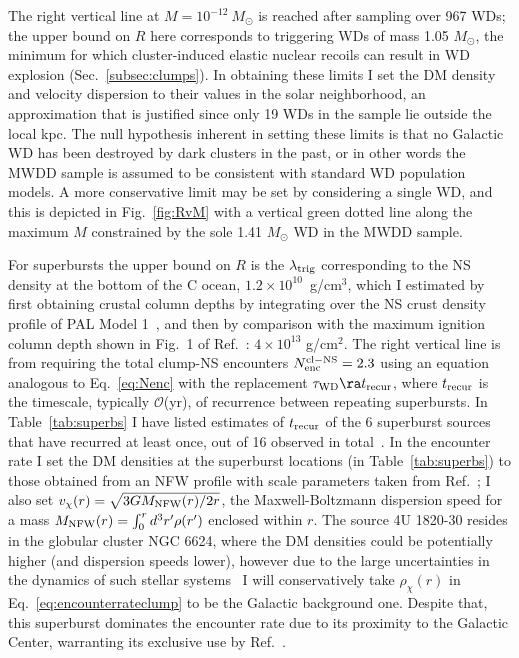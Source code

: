 \documentclass[
    twocolumn,
	prd,
        amssymb,
	preprintnumbers,
	secnumarabic,
	nofootinbib,
	superscriptaddress]{revtex4-1}
\begin{document}
The right vertical line at $M = 10^{-12}~M_\odot$ is reached after sampling over 967 WDs; the upper bound on $R$ here corresponds to triggering WDs of mass 1.05 $M_\odot$, the minimum for which cluster-induced elastic nuclear recoils can result in WD explosion (Sec.~\ref{subsec:clumps}).
In obtaining these limits I set the DM density and velocity dispersion to their values in the solar neighborhood, an approximation that is justified since only 19 WDs in the sample lie outside the local kpc.
The null hypothesis inherent in setting these limits is that no Galactic WD has been destroyed by dark clusters in the past, or in other words the MWDD sample is assumed to be consistent with standard WD population models.
A more conservative limit may be set by considering a single WD, and this is depicted in Fig.~\ref{fig:RvM} with a vertical green dotted line along the maximum $M$ constrained by the sole 1.41 $M_\odot$ WD in the MWDD sample.
 

For superbursts the upper bound on $R$ is the $\lambda_{\rm trig}$ corresponding to the NS density at the bottom of the C ocean, $1.2\times 10^{10}$~g/cm$^3$, which I estimated by first obtaining crustal column depths by integrating over the NS crust density profile of PAL Model 1~\cite{crustdensityprofileRRIIIA}, and then by comparison with the maximum ignition column depth shown in Fig.~1 of Ref.~\cite{supburst:Cflashes:Cumming:2001wg}: $4 \times 10^{13}$ g/cm$^2$.
The right vertical line is from requiring the total clump-NS encounters $N^{\rm cl-NS}_{\rm enc} = 2.3$ using an equation analogous to Eq.~\eqref{eq:Nenc} with the replacement $\tau_{\rm WD} \ra t_{\rm recur}$, where $t_{\rm recur}$ is the timescale, typically $\mathcal{O}$(yr), of recurrence between repeating superbursts.
In Table~\ref{tab:superbs} I have listed estimates of $t_{\rm recur}$ of the 6 superburst sources that have recurred at least once, out of 16 observed in total~\cite{supburst:catalog2023}. 
In the encounter rate I set the DM densities at the superburst locations (in Table~\ref{tab:superbs}) to those obtained from an NFW profile with scale parameters taken from Ref.~\cite{PPPCookbook:2010xx};
I also set $v_\chi (r) = \sqrt{3 G M_{\rm NFW}(r)/2r}$, the Maxwell-Boltzmann dispersion speed for a mass $M_{\rm NFW}(r) = \int_0^r d^3r^\prime \rho(r^\prime)$ enclosed within $r$.
The source 4U 1820-30 resides in the globular cluster NGC 6624, where the DM densities could be potentially higher (and dispersion speeds lower), however due to the large uncertainties in the dynamics of such stellar systems~\cite{globularGaraniRajReynosoC:2023esk} I will conservatively take $\rho_\chi (r)$ in Eq.~\eqref{eq:encounterrateclump} to be the Galactic background one. 
Despite that, this superburst dominates the encounter rate due to its proximity to the Galactic Center, warranting its exclusive use by Ref.~\cite{MACROSidhu2020}.
\end{document}
